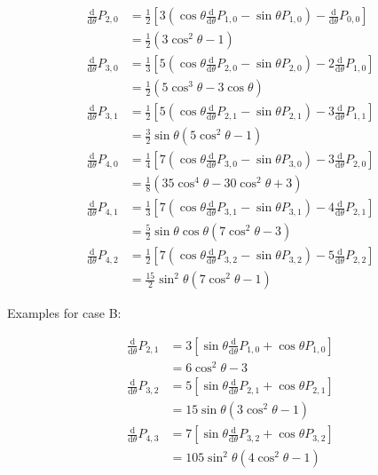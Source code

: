 \documentclass[]{article}
\begin{document}
		\begin{align}
			\frac{\text{d}}{\text{d}\theta}P_{2,0} &= \frac{1}{2}\left[3\left(\cos{\theta}\frac{\text{d}}{\text{d}\theta}P_{1,0} - \sin{\theta}P_{1,0}\right) - \frac{\text{d}}{\text{d} \theta} P_{0,0}\right] \\
				&= \frac{1}{2} (3 \cos^2{\theta} -1)\\
			\frac{\text{d}}{\text{d}\theta}P_{3,0} &= \frac{1}{3}\left[5\left(\cos{\theta}\frac{\text{d}}{\text{d}\theta}P_{2,0} - \sin{\theta}P_{2,0}\right) - 2\frac{\text{d}}{\text{d} \theta} P_{1,0}\right] \\
				&= \frac{1}{2}(5\cos^3{\theta} - 3\cos{\theta})\\
			\frac{\text{d}}{\text{d}\theta}P_{3,1} &= \frac{1}{2}\left[5\left(\cos{\theta}\frac{\text{d}}{\text{d}\theta}P_{2,1} - \sin{\theta}P_{2,1}\right) - 3\frac{\text{d}}{\text{d} \theta} P_{1,1}\right] \\
				&= \frac{3}{2}\sin{\theta}(5\cos^2{\theta} - 1)\\
			\frac{\text{d}}{\text{d}\theta}P_{4,0} &= \frac{1}{4}\left[7\left(\cos{\theta}\frac{\text{d}}{\text{d}\theta}P_{3,0} - \sin{\theta}P_{3,0}\right) - 3\frac{\text{d}}{\text{d} \theta} P_{2,0}\right] \\
				&= \frac{1}{8}(35\cos^4{\theta} - 30\cos^2{\theta} + 3)\\
			\frac{\text{d}}{\text{d}\theta}P_{4,1} &= \frac{1}{3}\left[7\left(\cos{\theta}\frac{\text{d}}{\text{d}\theta}P_{3,1} - \sin{\theta}P_{3,1}\right) - 4\frac{\text{d}}{\text{d} \theta} P_{2,1}\right] \\
				&= \frac{5}{2} \sin{\theta}\cos{\theta}(7\cos^2{\theta} - 3) \\
			\frac{\text{d}}{\text{d}\theta}P_{4,2} &= \frac{1}{2}\left[7\left(\cos{\theta}\frac{\text{d}}{\text{d}\theta}P_{3,2} - \sin{\theta}P_{3,2}\right) - 5\frac{\text{d}}{\text{d} \theta} P_{2,2}\right] \\
				&= \frac{15}{2}\sin^2{\theta}(7\cos^2{\theta} - 1)
		\end{align}
		
		Examples for case B:
		
		\begin{align}
			\frac{\text{d}}{\text{d}\theta}P_{2,1} &= 3 \left[\sin{\theta}\frac{\text{d}}{\text{d}\theta}P_{1,0} + \cos{\theta}P_{1,0}\right] \\
			&= 6 \cos^2{\theta} - 3\\
			\frac{\text{d}}{\text{d}\theta}P_{3,2} &= 5 \left[\sin{\theta}\frac{\text{d}}{\text{d}\theta}P_{2,1} + \cos{\theta}P_{2,1}\right] \\
			&= 15\sin{\theta}(3\cos^2{\theta} -1)\\
			\frac{\text{d}}{\text{d}\theta}P_{4,3} &= 7 \left[\sin{\theta}\frac{\text{d}}{\text{d}\theta}P_{3,2} + \cos{\theta}P_{3,2}\right] \\
			&= 105\sin^2{\theta}(4\cos^2{\theta} - 1)
		\end{align}
\end{document}
